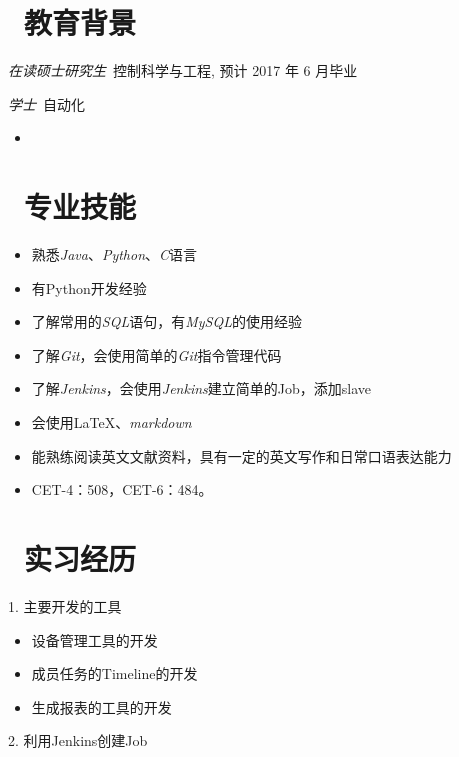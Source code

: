 \documentclass{resume}
\begin{document}



\section{\faGraduationCap\  教育背景}
\textit{在读硕士研究生}\ 控制科学与工程, 预计 2017 年 6 月毕业

\textit{学士}\ 自动化
\begin{itemize}
\item {}

\end{itemize}

\section{\faCogs\ 专业技能}
\begin{itemize}[parsep=1ex]
  \item 熟悉\emph{Java}、\emph{Python}、\emph{C}语言
  \item 有Python开发经验
  \item 了解常用的\emph{SQL}语句，有\emph{MySQL}的使用经验
  \item 了解\emph{Git}，会使用简单的\emph{Git}指令管理代码
  \item 了解\emph{Jenkins}，会使用\emph{Jenkins}建立简单的Job，添加slave
  \item 会使用\LaTeX 、\emph{markdown}
  \item 能熟练阅读英文文献资料，具有一定的英文写作和日常口语表达能力
  \item CET-4：508，CET-6：484。

\end{itemize}
\section{\faUsers\ 实习经历}
1. 主要开发的工具
\begin{itemize}[parsep=0.5ex]
\item 设备管理工具的开发
\item 成员任务的Timeline的开发
\item 生成报表的工具的开发
\end{itemize}
2. 利用Jenkins创建Job  
\end{document}
